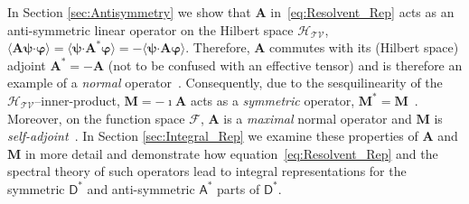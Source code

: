 \documentclass[leqno,onefignum,onetabnum]{siamltex1213}
\newcommand{\Mb}{\mathbf{M}}
\newcommand{\Ab}{\mathbf{A}}
\newcommand{\Tc}{\mathcal{T}}
\newcommand{\Vc}{\mathcal{V}}
\newcommand{\Hc}{\mathcal{H}}
\newcommand{\Fc}{\mathcal{F}}
\newcommand{\Dm}{\mathsf{D}}
\newcommand{\Am}{\mathsf{A}}
\providecommand\bcdot{\boldsymbol{\cdot}}
\newcommand{\vecpsi}{\boldsymbol{\psi}}
\newcommand{\vecvarphi}{\boldsymbol{\varphi}}
\begin{document}
In Section \ref{sec:Antisymmetry} we show that $\Ab$
in~\eqref{eq:Resolvent_Rep} acts as an anti-symmetric linear operator
on the Hilbert space $\Hc_{\Tc\Vc}$,
$\langle\Ab\vecpsi\bcdot\vecvarphi\rangle=\langle\vecpsi\bcdot\Ab^*\vecvarphi\rangle=-\langle\vecpsi\bcdot\Ab\vecvarphi\rangle$. Therefore,
$\Ab$ commutes with its (Hilbert space) adjoint $\Ab^*=-\Ab$ (not to
be confused with an effective tensor) and is therefore an example of a
\emph{normal} operator~\cite{Stone:64}. Consequently, due to the
sesquilinearity of the $\Hc_{\Tc\Vc}$--inner-product, $\Mb=-\imath\Ab$ acts
as a \emph{symmetric} operator,
$\Mb^*=\Mb$~\cite{Reed-1980,Stone:64}. Moreover, on the function space
$\Fc$, 
$\Ab$ is a \emph{maximal} normal operator and $\Mb$ is
\emph{self-adjoint}~\cite{Stone:64}. In Section \ref{sec:Integral_Rep}
we examine these properties of $\Ab$ and $\Mb$ in more detail and
demonstrate how equation~\eqref{eq:Resolvent_Rep} and the spectral
theory of such operators lead to integral representations for the
symmetric $\Dm^*$ and anti-symmetric $\Am^*$ parts of $\Dm^*$.      
\end{document}
